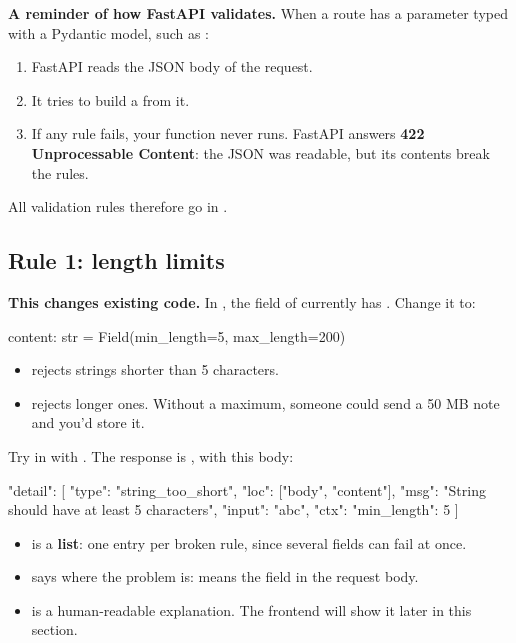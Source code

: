\textbf{A reminder of how FastAPI validates.} When a route has a parameter typed with a Pydantic model, such as :
\begin{enumerate}
\item FastAPI reads the JSON body of the request.
\item It tries to build a  from it.
\item If any rule fails, your function never runs. FastAPI answers \textbf{422 Unprocessable Content}: the JSON was readable, but its contents break the rules.
\end{enumerate}

All validation rules therefore go in .

\subsection{Rule 1: length limits}

\textbf{This changes existing code.} In , the  field of  currently has . Change it to:

\begin{py}
content: str = Field(min_length=5, max_length=200)
\end{py}

\begin{itemize}
\item {} rejects strings shorter than 5 characters.
\item {} rejects longer ones. Without a maximum, someone could send a 50 MB note and you'd store it.
\end{itemize}

Try  in  with . The response is , with this body:

\begin{code}
{
  "detail": [
    {
      "type": "string_too_short",
      "loc": ["body", "content"],
      "msg": "String should have at least 5 characters",
      "input": "abc",
      "ctx": {"min_length": 5}
    }
  ]
}
\end{code}

\begin{itemize}
\item {} is a \textbf{list}: one entry per broken rule, since several fields can fail at once.
\item {} says where the problem is:  means the field  in the request body.
\item {} is a human-readable explanation. The frontend will show it later in this section.
\end{itemize}

